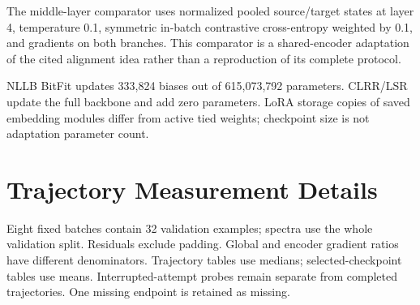 \documentclass[11pt]{article}
\begin{document}
The middle-layer comparator uses normalized pooled source/target states at layer 4, temperature 0.1, symmetric in-batch contrastive cross-entropy weighted by 0.1, and gradients on both branches. This comparator is a shared-encoder adaptation of the cited alignment idea rather than a reproduction of its complete protocol.

NLLB BitFit updates 333,824 biases out of 615,073,792 parameters. CLRR/LSR update the full backbone and add zero parameters. LoRA storage copies of saved embedding modules differ from active tied weights; checkpoint size is not adaptation parameter count.

\section{Trajectory Measurement Details}
\begin{table}[!ht]
\centering
\caption{Fresh Full trajectories (C). Gradient ratios are medians across eight identical validation batches. Endpoint is the actual training endpoint, not necessarily the validation-selected checkpoint. Singular effective ranks are from all validation sentences. Probes are observational.}
\label{tab:trajectory}
\renewcommand{\arraystretch}{1.15}
\end{table}
Eight fixed batches contain 32 validation examples; spectra use the whole validation split. Residuals exclude padding. Global and encoder gradient ratios have different denominators. Trajectory tables use medians; selected-checkpoint tables use means. Interrupted-attempt probes remain separate from completed trajectories. One missing endpoint is retained as missing.
\end{document}
